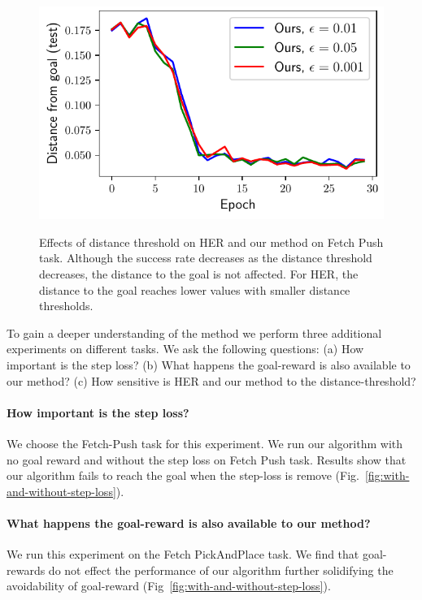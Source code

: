 \begin{figure}
\begin{minipage}[b]{\frac\linewidth}
  \includegraphics[width=\frac\columnwidth]{media/res/ablate-ddpg-dqst-low_tresh_chosen-low_thresh_alt-dqst/0.001-FetchPushPR-be467dfepoch-test/ag_g_dist.pdf}%
  \label{fig:distance}
\end{minipage}
  \caption{Effects of distance threshold on HER and our method on Fetch Push
task. Although the success rate decreases as the distance threshold decreases,
the distance to the goal is not affected. For HER, the distance to the goal
reaches lower values with smaller distance thresholds.}%
  \label{fig:with-different-distance-thresholds}%
\end{figure}%
% 

To gain a deeper understanding of the method we perform three additional
experiments on different tasks. We ask the following questions:
(a) How important is the step loss?
(b) What happens the goal-reward is also available to our method?
(c) How sensitive is HER and our method to the distance-threshold?
\paragraph{How important is the step loss?}
%
We choose the Fetch-Push task for this experiment.
We run our algorithm with no goal reward and without the step loss on Fetch Push
task. Results show that our algorithm fails to reach the goal when the
step-loss is remove (Fig.~\ref{fig:with-and-without-step-loss}).

\paragraph{What happens the goal-reward is also available to our method?}
We run this experiment on the Fetch PickAndPlace task. We find that
goal-rewards do not effect the performance of our algorithm further
solidifying the avoidability of goal-reward (Fig~\ref{fig:with-and-without-step-loss}).

